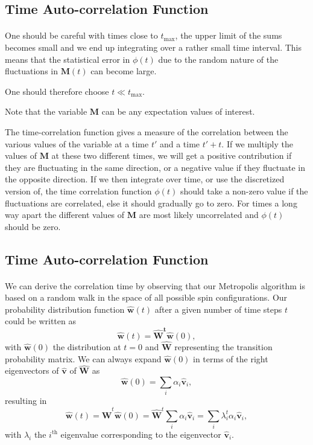 \subsection*{Time Auto-correlation Function}

\paragraph{}

One should be careful with times close to $t_{\mathrm{max}}$, the upper limit of the sums 
becomes small and we end up integrating over a rather small time interval. This means that the statistical
error in $\phi(t)$ due to the random nature of the fluctuations in $\mathbf{M}(t)$ can become large.

One should therefore choose $t \ll t_{\mathrm{max}}$.

Note that the variable $\mathbf{M}$ can be any expectation values of interest.

The time-correlation function gives a measure of the correlation between the various values of the variable 
at a time $t'$ and a time $t'+t$. If we multiply the values of $\mathbf{M}$ at these two different times,
we will get a positive contribution if they are fluctuating in the same direction, or a negative value
if they fluctuate in the opposite direction. If we then integrate over time, or use the discretized version of, the time correlation function $\phi(t)$ should take a non-zero value if the fluctuations are 
correlated, else it should gradually go to zero. For times a long way apart 
the different values of $\mathbf{M}$  are most likely 
uncorrelated and $\phi(t)$ should be zero.



\subsection*{Time Auto-correlation Function}

\paragraph{}
We can derive the correlation time by observing that our Metropolis algorithm is based on a random
walk in the space of all  possible spin configurations. 
Our probability 
distribution function $\mathbf{\hat{w}}(t)$ after a given number of time steps $t$ could be written as
\[
   \mathbf{\hat{w}}(t) = \mathbf{\hat{W}^t\hat{w}}(0),
\]
with $\mathbf{\hat{w}}(0)$ the distribution at $t=0$ and $\mathbf{\hat{W}}$ representing the 
transition probability matrix. 
We can always expand $\mathbf{\hat{w}}(0)$ in terms of the right eigenvectors of 
$\mathbf{\hat{v}}$ of $\mathbf{\hat{W}}$ as 
\[
    \mathbf{\hat{w}}(0)  = \sum_i\alpha_i\mathbf{\hat{v}}_i,
\]
resulting in 
\[
   \mathbf{\hat{w}}(t) = \mathbf{\hat{W}}^t\mathbf{\hat{w}}(0)=\mathbf{\hat{W}}^t\sum_i\alpha_i\mathbf{\hat{v}}_i=
\sum_i\lambda_i^t\alpha_i\mathbf{\hat{v}}_i,
\]
with $\lambda_i$ the $i^{\mathrm{th}}$ eigenvalue corresponding to  
the eigenvector $\mathbf{\hat{v}}_i$.



